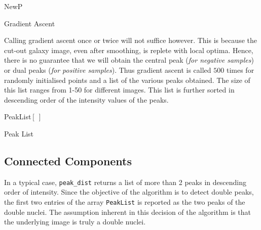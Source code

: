 \documentclass[12pt]{article}
\begin{document}
\begin{algorithm}[H]
\SetAlgoLined
 \DontPrintSemicolon
  \KwRet NewP\;
 \caption{Gradient Ascent}
 \label{algo:grad_asc}
\end{algorithm}

\bigskip

Calling gradient ascent once or twice will not suffice however. This is because the cut-out galaxy image, even after smoothing, is replete with local optima. Hence, there is no guarantee that we will obtain the central peak (\textit{for negative samples}) or dual peaks (\textit{for positive samples}). Thus gradient ascent is called $500$ times for randomly initialised points and a list of the various peaks obtained. The size of this list ranges from 1-50 for different images. This list is further sorted in descending order of the intensity values of the peaks.

\bigskip


\begin{algorithm}[H]
\DontPrintSemicolon
  \KwRet PeakList$\left[\ \right]$ \;
 \caption{Peak List}
\end{algorithm}

\bigskip

\subsection{Connected Components}

In a typical case, \texttt{peak\_dist} returns a list of more than 2 peaks in descending order of intensity. Since the objective of the algorithm is to detect double peaks, the first two entries of the array \texttt{PeakList} is reported as the two peaks of the double nuclei. The assumption inherent in this decision of the algorithm is that the underlying image is truly a double nuclei.
\end{document}
